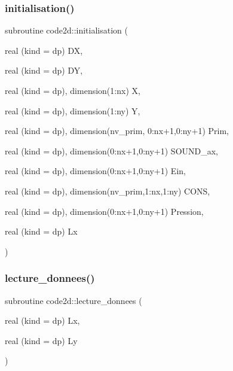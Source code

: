 \subsubsection{\texorpdfstring{initialisation()}{initialisation()}}
{\footnotesize\ttfamily subroutine code2d\+::initialisation (\begin{DoxyParamCaption}\item[{real (kind = dp)}]{DX,  }\item[{real (kind = dp)}]{DY,  }\item[{real (kind = dp), dimension(1\+:nx)}]{X,  }\item[{real (kind = dp), dimension(1\+:ny)}]{Y,  }\item[{real (kind = dp), dimension(nv\+\_\+prim, 0\+:nx+1,0\+:ny+1)}]{Prim,  }\item[{real (kind = dp), dimension(0\+:nx+1,0\+:ny+1)}]{S\+O\+U\+N\+D\+\_\+ax,  }\item[{real (kind = dp), dimension(0\+:nx+1,0\+:ny+1)}]{Ein,  }\item[{real (kind = dp), dimension(nv\+\_\+prim,1\+:nx,1\+:ny)}]{C\+O\+NS,  }\item[{real (kind = dp), dimension(0\+:nx+1,0\+:ny+1)}]{Pression,  }\item[{real (kind = dp)}]{Lx }\end{DoxyParamCaption})}

\mbox{\label{mainSW_8f90_a7e06ba833aef7743b6a2f1be79f4bc2e}} 
\subsubsection{\texorpdfstring{lecture\+\_\+donnees()}{lecture\_donnees()}}
{\footnotesize\ttfamily subroutine code2d\+::lecture\+\_\+donnees (\begin{DoxyParamCaption}\item[{real (kind = dp)}]{Lx,  }\item[{real (kind = dp)}]{Ly }\end{DoxyParamCaption})}

\mbox{\label{mainSW_8f90_a7645bf861c24416d7be2b579253bb6d4}} 
